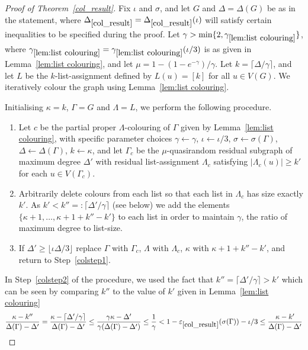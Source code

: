 \documentclass[11pt]{article}
\theoremstyle{plain}
\newcommand{\eps}{\varepsilon}
\begin{document}
\begin{proof}[Proof of Theorem~\ref{col_result}]
Fix $\iota$ and $\sigma$, and let $G$ and $\Delta=\Delta(G)$ be as in the statement, where $\Delta_{\ref{col_result}}=\Delta_{\ref{col_result}}(\iota)$ will satisfy certain inequalities to be specified during the proof.
Let $\gamma>\min\{2,\gamma_{\ref{lem:list colouring}}\}$, where $\gamma_{\ref{lem:list colouring}}=\gamma_{\ref{lem:list colouring}}(\iota/3)$ is as given in Lemma~\ref{lem:list colouring}, and let $\mu = 1-(1-e^{-\gamma})/\gamma$. 
Let $k=\lceil\Delta/\gamma\rceil$, and let $L$ be the $k$-list-assignment defined by $L(u)=[k]$ for all $u\in V(G)$.
We iteratively colour the graph using Lemma~\ref{lem:list colouring}. 

Initialising $\kappa=k$, $\Gamma=G$ and $\Lambda=L$, we perform the following procedure.
\begin{enumerate}
    \item\label{colstep1} Let $c$ be the partial proper $\Lambda$-colouring of $\Gamma$ given by Lemma~\ref{lem:list colouring}, with specific parameter choices $\gamma\leftarrow\gamma$, $\iota\leftarrow\iota/3$, $\sigma\leftarrow\sigma(\Gamma)$, $\Delta\leftarrow\Delta(\Gamma)$, $k\leftarrow\kappa$, and let $\Gamma_c$ be the $\mu$-quasirandom residual subgraph of maximum degree $\Delta'$ with residual list-assignment $\Lambda_c$ satisfying $|\Lambda_c(u)| \ge k'$ for each $u\in V(\Gamma_c)$.
    \item\label{colstep2}  Arbitrarily delete colours from each list so that each list in $\Lambda_c$ has size exactly $k'$. As $k'< k''=:\lceil\Delta'/\gamma\rceil$ (see below) we add the elements $\{\kappa+1,\dots,\kappa+1+k''-k'\}$ to each list in order to maintain $\gamma$, the ratio of maximum degree to list-size.
    \item\label{colstep3} If $\Delta'\ge\lfloor\iota\Delta/3\rfloor$ replace $\Gamma$ with $\Gamma_c$, $\Lambda$ with $\Lambda_c$, $\kappa$ with $\kappa+1+k''-k'$, and return to Step~\ref{colstep1}.
\end{enumerate}
In Step~\ref{colstep2} of the procedure, we used the fact that $k''=\lceil\Delta'/\gamma\rceil > k'$ which can be seen by comparing $k''$ to the value of $k'$ given in Lemma~\ref{lem:list colouring} 
\[
\frac{\kappa-k''}{\Delta(\Gamma)-\Delta'}= \frac{\kappa-\left\lceil\Delta'/\gamma\right\rceil}{\Delta(\Gamma)-\Delta'}\leq\frac{\gamma \kappa-\Delta'}{\gamma(\Delta(\Gamma)-\Delta')}  \le\frac1\gamma<1-\eps_{\ref{col_result}}(\sigma(\Gamma))-\iota/3 \leq \frac{\kappa-k'}{\Delta(\Gamma)-\Delta'}
\]


\end{proof}
\end{document}
